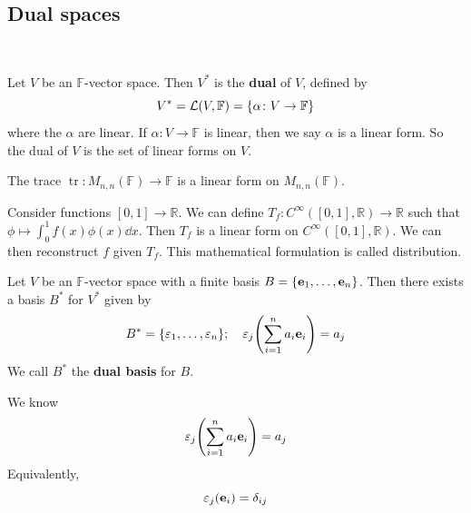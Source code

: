 \documentclass[a4paper]{article}
\begin{document}
\subsection{Dual spaces}\ \vspace*{-1.5em}
\begin{definition}
	Let $ V $ be an $ \mathbb{F} $-vector space.
	Then $ V^* $ is the \textbf{dual} of $ V $, defined by
	\[
		V^* = {\mathcal{L}}(V,\mathbb F) = \qty{\alpha \colon V \to \mathbb F}
	\]
	where the $ \alpha $ are linear.
	If $ \alpha \colon V \to \mathbb F $ is linear, then we say $ \alpha $ is a linear form.
	So the dual of $ V $ is the set of linear forms on $ V $.
\end{definition}
\begin{example}
	The trace $ \operatorname{tr} \colon M_{n,n}(\mathbb F) \to \mathbb F $ is a linear form on $ M_{n,n}(\mathbb F) $.
\end{example}
\begin{example}
	Consider functions $ [0,1] \to \mathbb R $.
	We can define $ T_f \colon C^\infty([0,1], \mathbb R) \to \mathbb R $ such that $ \phi \mapsto \int_0^1 f(x) \phi(x) \dd{x} $.
	Then $ T_f $ is a linear form on $ C^{\infty}([0,1], \mathbb R) $.
	We can then reconstruct $ f $ given $ T_f $.
	This mathematical formulation is called distribution.
\end{example}
\begin{lemma}
	Let $ V $ be an $ \mathbb F $-vector space with a finite basis $ B = \qty{{\bf e}_1, \dots, {\bf e}_n} $.
	Then there exists a basis $ B^* $ for $ V^* $ given by
	\[
		B^* = \qty{\varepsilon_1, \dots, \varepsilon_n}; \quad \varepsilon_j \qty( \sum_{i=1}^n a_i {\bf e}_i ) = a_j
	\]
	We call $ B^* $ the \textbf{dual basis} for $ B $.
\end{lemma}
We know
\[
    \varepsilon_j \qty( \sum_{i=1}^n a_i {\bf e}_i ) = a_j
\]
Equivalently,
\[
    \varepsilon_j ({\bf e}_i) = \delta_{ij}
\]
\end{document}
